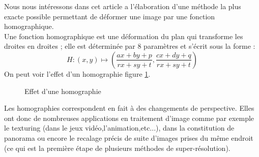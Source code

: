 



	Nous nous intéressons dans cet article a l'élaboration d'une méthode la plus exacte possible permettant de déformer une image par une fonction homographique. \\
 	Une fonction homographique est une déformation du plan qui transforme les droites en droites ; elle est déterminée par 8 paramètres et s'écrit sous la forme :
	\[H : (x,y)\mapsto\left( \frac{ax+by+p}{rx+sy+t},\frac{cx+dy+q}{rx+sy+t}\right)\] 
On peut voir l'effet d'un homographie figure \ref{effethom}.\\

 \begin{figure}
 
   \centering
    \arrowPDP 
   \caption{Effet d'une homographie}
\label{effethom}
 \end{figure}

	Les homographies correspondent en fait à des changements de perspective. Elles ont donc de nombreuses applications en traitement d'image comme par exemple le texturing (dans le jeux vidéo,l'animation,etc...), dans la constitution de panorama ou encore le recalage précis de suite d'images prises du même endroit (ce qui est la première étape de plusieurs méthodes de super-résolution).


